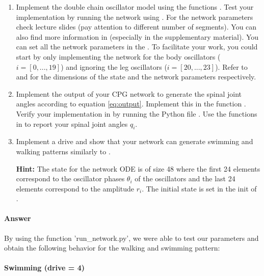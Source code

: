 \documentclass{cmc}
\begin{document}
\begin{enumerate}
\item Implement the double chain oscillator model using the functions
  . Test your implementation by running the
  network using . For the network parameters check
  lecture slides (pay attention to different number of segments). You can also
  find more information in \cite{ijspeert2007swimming} (especially in the
  supplementary material). You can set all the network parameters in the
  . To facilitate your work, you
  could start by only implementing the network for the body oscillators
  ($i=[0, ..., 19]$) and ignoring the leg oscillators ($i=[20, ..., 23]$). Refer
  to  and
  \- for the dimensions of
  the state and the network parameters respectively.

\item Implement the output of your CPG network to generate the spinal joint
  angles according to equation \ref{eq:output}. Implement this in the function
  . Verify your implementation in by running
  the Python file .  Use the functions in
   to report your spinal joint angles $q_i$.

\item Implement a drive and show that your network can generate swimming and
  walking patterns similarly to \cite{ijspeert2007swimming}.


  \textbf{Hint:} The state for the network ODE is of size 48 where the first 24
  elements correspond to the oscillator phases $\theta_i$ of the oscillators and
  the last 24 elements correspond to the amplitude $r_i$. The initial state is
  set in the init of .
\end{enumerate}

\paragraph{Answer}

By using the function 'run\_network.py', we were able to test our parameters and obtain the following behavior for the walking and swimming pattern:

\paragraph{Swimming (drive = 4)}
\end{document}
